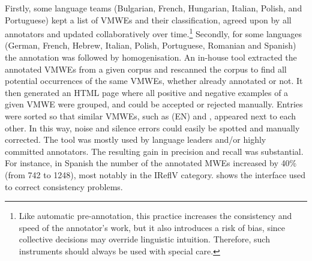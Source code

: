 \documentclass[output=paper,modfonts]{langscibook}
\begin{document}
Firstly, some language teams (Bulgarian, French, Hungarian, Italian, Polish, and Portuguese) kept a list of VMWEs and their classification, agreed upon by all annotators and updated collaboratively over time.\footnote{Like automatic pre-annotation, this practice increases the consistency and speed of the annotator's work, but it also introduces a risk of bias, since collective decisions may override linguistic intuition. Therefore, such instruments should always be used with special care.}
Secondly, for some languages (German, French, Hebrew, Italian, Polish, Portuguese, Romanian and Spanish) the annotation was followed by homogenisation. 
An in-house tool extracted the annotated VMWEs from a given  corpus and rescanned the corpus to find all potential occurrences of the same VMWEs, whether already annotated or not. It then generated an HTML page where all positive and negative examples of a given VMWE were grouped, and could be accepted or rejected manually.
Entries were sorted so that similar VMWEs, such as (EN)  and , appeared next to each other.  %
In this way, noise and silence errors could easily be spotted and manually corrected. The tool was mostly used by language leaders and/or highly committed annotators. The resulting gain in precision and recall was substantial. For instance, in Spanish the number of the annotated MWEs increased by 40\% (from 742 to 1248), most notably in the IReflV category.  shows the interface used to correct consistency problems.
\end{document}
